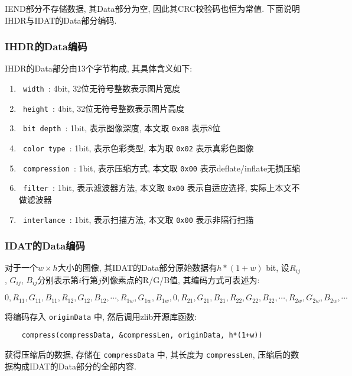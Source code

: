 \documentclass[UTF8]{ctexart}
\begin{document}
IEND部分不存储数据, 其Data部分为空, 因此其CRC校验码也恒为常值. 下面说明IHDR与IDAT的Data部分编码.

\subsubsection{IHDR的Data编码}

IHDR的Data部分由13个字节构成, 其具体含义如下: 

\begin{enumerate}[itemindent=2em]
    \setlength{\itemsep}{-5pt}
    \item \verb| width |: 4bit, 32位无符号整数表示图片宽度
    \item \verb| height |: 4bit, 32位无符号整数表示图片高度
    \item \verb| bit depth |: 1bit, 表示图像深度, 本文取 \verb |0x08| 表示8位
    \item \verb| color type |: 1bit, 表示色彩类型, 本为取 \verb |0x02| 表示真彩色图像
    \item \verb| compression |: 1bit, 表示压缩方式, 本文取 \verb |0x00| 表示deflate/inflate无损压缩
    \item \verb| filter |: 1bit, 表示滤波器方法, 本文取 \verb |0x00| 表示自适应选择, 实际上本文不做滤波器
    \item \verb| interlance |: 1bit, 表示扫描方法, 本文取 \verb |0x00| 表示非隔行扫描
\end{enumerate}

\subsubsection{IDAT的Data编码}

对于一个$w\times h$大小的图像, 其IDAT的Data部分原始数据有$h*(1+w)$ bit, 设$R_{ij}$, $G_{ij}$, $B_{ij}$分别表示第$i$行第$j$列像素点的R/G/B值, 其编码方式可表述为: 

\newpage
\begin{equation*}
    0,R_{11},G_{11},B_{11},R_{12},G_{12},B_{12},\cdots,R_{1w},G_{1w},B_{1w},0,R_{21},G_{21},B_{21},R_{22},G_{22},B_{22},\cdots,R_{2w},G_{2w},B_{2w},\cdots
\end{equation*}

将编码存入 \verb |originData| 中, 然后调用zlib开源库函数: 

\begin{verbatim}
    compress(compressData, &compressLen, originData, h*(1+w))
\end{verbatim}

获得压缩后的数据, 存储在 \verb |compressData| 中, 其长度为 \verb |compressLen|, 压缩后的数据构成IDAT的Data部分的全部内容.
\end{document}
